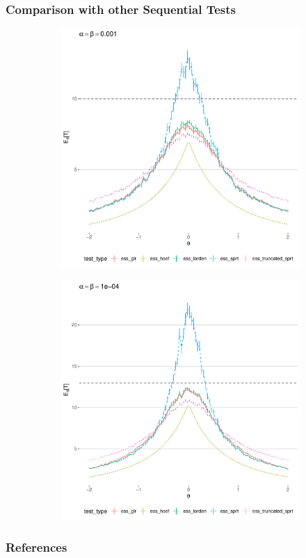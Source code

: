 \documentclass[10pt]{beamer}
\begin{document}
\begin{frame}
\frametitle{Comparison with other Sequential Tests}

\begin{figure}
\centering
\begin{subfigure}{0.49\textwidth}
    \includegraphics[width=\textwidth]{images/ess_alpha1e3}
\end{subfigure}
\hfill
\begin{subfigure}{0.49\textwidth}
    \includegraphics[width=\textwidth]{images/ess_alpha1e4}
\end{subfigure}
\end{figure}
\end{frame}

\begin{frame}[allowframebreaks]
\frametitle{References}




\end{frame}
\end{document}
